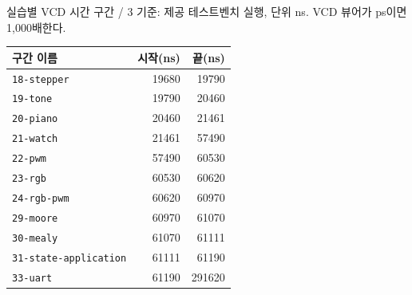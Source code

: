 \documentclass[aspectratio=169,11pt]{beamer}
\begin{document}
\begin{frame}[t]{실습별 VCD 시간 구간 / 3}
\fontsize{8}{9}\selectfont
기준: 제공 테스트벤치 실행, 단위 ns. VCD 뷰어가 ps이면 1,000배한다.
\begin{center}\renewcommand{\arraystretch}{1.05}
\begin{tabular}{lrr}\toprule
구간 이름 & 시작(ns) & 끝(ns)\\\midrule
\texttt{18-stepper} & 19680 & 19790 \\
\texttt{19-tone} & 19790 & 20460 \\
\texttt{20-piano} & 20460 & 21461 \\
\texttt{21-watch} & 21461 & 57490 \\
\texttt{22-pwm} & 57490 & 60530 \\
\texttt{23-rgb} & 60530 & 60620 \\
\texttt{24-rgb-pwm} & 60620 & 60970 \\
\texttt{29-moore} & 60970 & 61070 \\
\texttt{30-mealy} & 61070 & 61111 \\
\texttt{31-state-application} & 61111 & 61190 \\
\texttt{33-uart} & 61190 & 291620 \\
\bottomrule\end{tabular}\end{center}
\end{frame}
\end{document}
